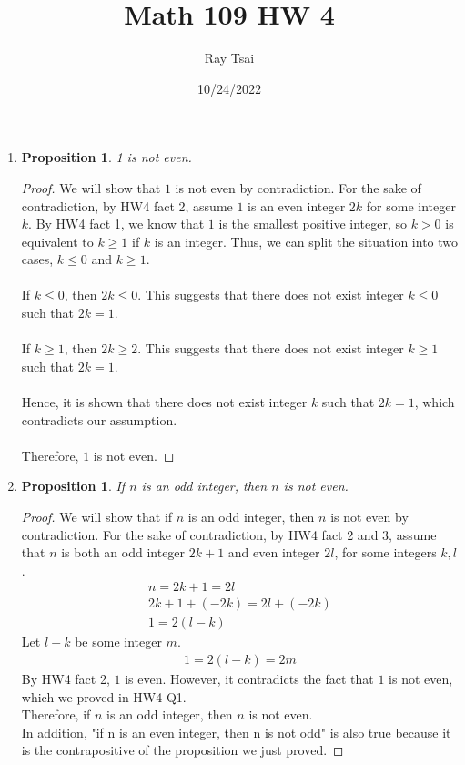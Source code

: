 \documentclass{article}
\title{Math 109 HW 4}
\author{Ray Tsai}
\date{10/24/2022}
\newtheorem{prop}[thm]{Proposition}
\begin{document}
 

\maketitle 

\begin{enumerate}
\item 
\begin{prop}
    1 is not even.
\end{prop}
\begin{proof}
We will show that $1$ is not even by contradiction. For the sake of contradiction, by HW4 fact 2, assume $1$ is an even integer $2k$ for some integer $k$. By HW4 fact 1, we know that $1$ is the smallest positive integer, so $k > 0$ is equivalent to $k \geq 1$ if $k$ is an integer. Thus, we can split the situation into two cases, $k \leq 0$ and $k \geq 1$.  \\\\
If $k \leq 0$, then $2k \leq 0$. This suggests that there does not exist integer $k \leq 0$ such that $2k = 1$. \\\\
If $k \geq 1$, then $2k \geq 2$. This suggests that there does not exist integer $k \geq 1$ such that $2k = 1$. \\\\
Hence, it is shown that there does not exist integer $k$ such that $2k = 1$, which contradicts our assumption. \\\\
Therefore, $1$ is not even.
\end{proof}

\item 
\begin{prop}
If $n$ is an odd integer, then $n$ is not even.
\end{prop}
\begin{proof}
We will show that if $n$ is an odd integer, then $n$ is not even by contradiction. For the sake of contradiction, by HW4 fact 2 and 3, assume that $n$ is both an odd integer $2k + 1$ and even integer $2l$, for some integers $k, l$. 
\begin{gather}
    n = 2k + 1 = 2l \\
    2k + 1 + (-2k) = 2l + (-2k) \\ 
    1 = 2(l - k)
\end{gather}
Let $l - k$ be some integer $m$.
\begin{gather}
    1 = 2(l - k) = 2m
\end{gather}
By HW4 fact 2, $1$ is even. However, it contradicts the fact that $1$ is not even, which we proved in HW4 Q1. \\
Therefore, if $n$ is an odd integer, then $n$ is not even. \\
In addition, "if n is an even integer, then n is not odd" is also true because it is the contrapositive of the proposition we just proved.
\end{proof}


\end{enumerate}
\end{document}
